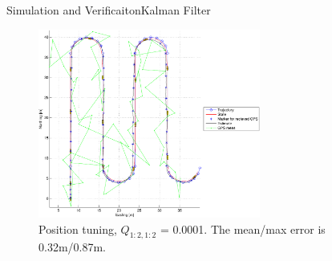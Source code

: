 \documentclass[10pt,handout]{beamer}
\begin{document}
%
%

\begin{frame}{Simulation and Verificaiton}{Kalman Filter}
  \begin{figure}
    \includegraphics[width=0.65\textwidth]{../../code/matlab/q0,0001}
    \caption{\scriptsize Position tuning, $Q_{1:2,1:2}$ = 0.0001. The mean/max error is 0.32m/0.87m.}
    \label{fig:q0.0001}
  \end{figure}
\end{frame}

\end{document}
